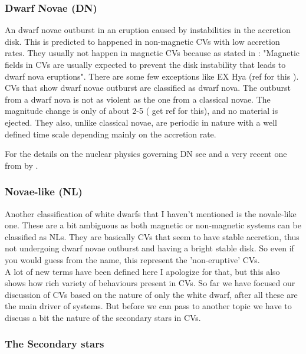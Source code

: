 \subsubsection{Dwarf Novae (DN)}

An dwarf novae outburst in an eruption caused by instabilities in the accretion disk. This is predicted to happened in non-magnetic CVs with low accretion rates. They usually not happen in magnetic CVs because as stated in \cite{shara_erupting_2005}: "Magnetic fields in CVs are usually expected to prevent the disk instability that leads to dwarf nova eruptions". There are some few exceptions like EX Hya (ref for this \cite{a}). CVs that show dwarf novae outburst are classified as dwarf nova. The outburst from a dwarf nova is not as violent as the one from a classical novae. The magnitude change is only of about 2-5 (\cite{ref} get ref for this), and no material is ejected. They also, unlike classical novae, are periodic in nature with a well defined time scale depending mainly on the accretion rate.  

For the details on the nuclear physics governing DN see\cite{shara_recent_1989} and a very recent one from \citeyear{starrfield_thermonuclear_2016} by \citeauthor{starrfield_thermonuclear_2016}. \\



\subsubsection{Novae-like (NL)}

Another classification of white dwarfs that I haven't mentioned is the novale-like one. These are a bit ambiguous as both magnetic or non-magnetic systems can be classified as NLs. They are basically CVs that seem to have stable accretion, thus not undergoing dwarf novae outburst and having a bright stable disk. So even if you would guess from the name, this represent the 'non-eruptive' CVs. \\

A lot of new terms have been defined here I apologize for that, but this also shows how rich variety of behaviours present in CVs. So far we have focused our discussion of CVs based on the nature of only the white dwarf, after all these are the main driver of systems. But before we can pass to another topic we have to discuss a bit the nature of the secondary stars in CVs. 


\subsubsection{The Secondary stars}


